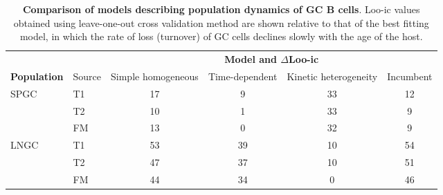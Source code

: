 \documentclass[11pt]{article}
\begin{document}
	\begin{table}[h!]
		\begin{center}
			\renewcommand{\arraystretch}{1.25}
			\begin{tabular}{l l c c c c} 
				\toprule 
				     &         & \multicolumn{4}{c}{\textbf{Model and $\Delta$Loo-ic}} \\
				\cline{3-6}
				\textbf{Population} & Source     & {\small Simple homogeneous}&  {\small Time-dependent}    & {\small Kinetic heterogeneity}& {\small Incumbent} \\ 
				\toprule
				SPGC &   T1    &   17           &          9            &           33         &          12        \\ 
			 	     &   T2    &   10           &          1            &           33         &          9        \\ 
			         &   FM    &   13           &          0            &           32         &          9        \\ 
				\hline
				LNGC &   T1    &   53           &          39           &           10         &          54         \\ 
				     &   T2    &   47           &          37           &           10         &          51         \\ 
				     &   FM    &   44           &          34           &           0          &          46         \\ 
				\hline
				\toprule 
			\end{tabular}
		\end{center}
		\caption{\small \textbf{Comparison of models describing population dynamics of GC B cells}. Loo-ic values obtained using leave-one-out cross validation method are shown relative to that of the best fitting model, in which the rate of loss  (turnover) of GC cells declines slowly with the age of the host.} 
		\label{tab:GC-AICs}
	\end{table} 
	
	\vspace{1cm}
	
\end{document}
